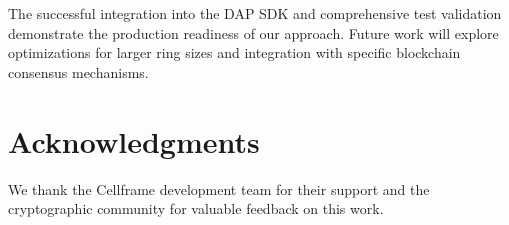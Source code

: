 \documentclass[11pt,a4paper]{article}
\begin{document}
The successful integration into the DAP SDK and comprehensive test validation demonstrate the production readiness of our approach. Future work will explore optimizations for larger ring sizes and integration with specific blockchain consensus mechanisms.

\section{Acknowledgments}

We thank the Cellframe development team for their support and the cryptographic community for valuable feedback on this work.



\end{document}
